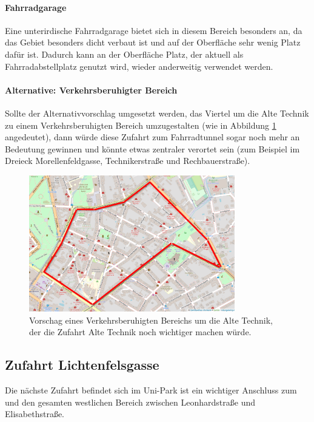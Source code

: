 \paragraph{Fahrradgarage}
Eine unterirdische Fahrradgarage bietet sich in diesem Bereich besonders an, da das Gebiet besonders dicht verbaut ist und auf der Oberfläche sehr wenig Platz dafür ist. Dadurch kann an der Oberfläche Platz, der aktuell als Fahrradabstellplatz genutzt wird, wieder anderweitig verwendet werden.

\paragraph{Alternative: Verkehrsberuhigter Bereich}
Sollte der Alternativvorschlag umgesetzt werden, das Viertel um die Alte Technik zu einem Verkehrsberuhigten Bereich umzugestalten (wie in Abbildung \ref{fig:alte_technik_vbb} angedeutet), dann würde diese Zufahrt zum Fahrradtunnel sogar noch mehr an Bedeutung gewinnen und könnte etwas zentraler verortet sein (zum Beispiel im Dreieck Morellenfeldgasse, Technikerstraße und Rechbauerstraße). %

\begin{figure}
    \centering
    \includegraphics[width=0.8\textwidth]{main/bike/tunnel/uni/verkehrsberuhigter_bereich}
    \caption[Verkehrsberuhigkter Bereich Alte Technik]{Vorschag eines Verkehrsberuhigten Bereichs um die Alte Technik, der die Zufahrt Alte Technik noch wichtiger machen würde.}
    \label{fig:alte_technik_vbb}
\end{figure}

\subsection{Zufahrt Lichtenfelsgasse}
Die nächste Zufahrt befindet sich im Uni-Park ist ein wichtiger Anschluss zum  und den gesamten westlichen Bereich zwischen Leonhardstraße und Elisabethstraße.

